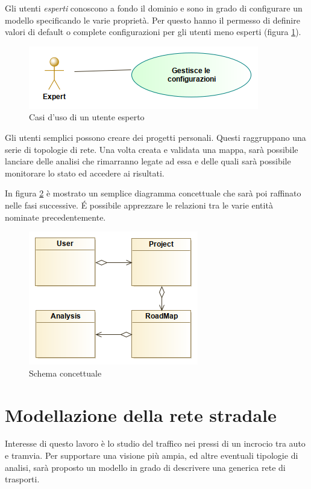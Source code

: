 Gli utenti \textit{esperti} conoscono a fondo il dominio e sono in grado di configurare un modello specificando le varie proprietà.
Per questo hanno il permesso di definire valori di default o complete configurazioni per gli utenti meno esperti (figura \ref{fig:uc-experts}).

\begin{figure}[h]
	\centering
	\includegraphics[scale=0.5]{img/ExpertUC}
	\caption{Casi d'uso di un utente esperto}
	\label{fig:uc-experts}
\end{figure}

Gli utenti semplici possono creare dei progetti personali.
Questi raggruppano una serie di topologie di rete.
Una volta creata e validata una mappa, sarà possibile lanciare delle analisi che rimarranno legate ad essa e delle quali sarà possibile monitorare lo stato ed accedere ai risultati.

In figura \ref{fig:cd-conceptual} è mostrato un semplice diagramma concettuale che sarà poi raffinato nelle fasi successive.
\'E possibile apprezzare le relazioni tra le varie entità nominate precedentemente.

\begin{figure}[h]
	\centering
	\includegraphics[scale=0.5]{img/conceptual00}
	\caption{Schema concettuale}
	\label{fig:cd-conceptual}
\end{figure}



\section{Modellazione della rete stradale}
Interesse di questo lavoro è lo studio del traffico nei pressi di un incrocio tra auto e tramvia.
Per supportare una visione più ampia, ed altre eventuali tipologie di analisi, sarà proposto un modello in grado di descrivere una generica rete di trasporti.

